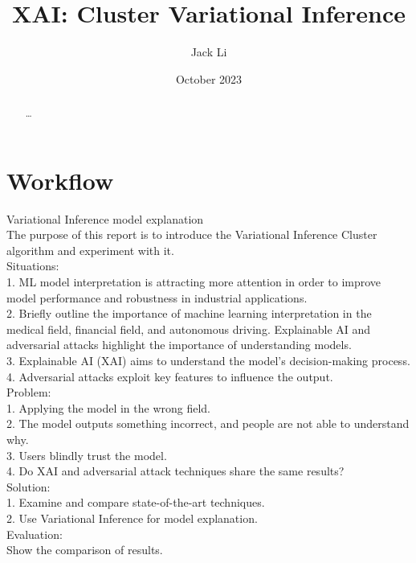 \documentclass[12pt]{article}
\title{XAI: Cluster Variational Inference}
\author{Jack Li}
\date{October 2023}
\begin{document}
\maketitle

\begin{abstract}
\ldots


\end{abstract}

\section{Workflow}

Variational Inference model explanation\\
The purpose of this report is to introduce the Variational Inference Cluster algorithm and experiment with it. \\

Situations:\\
1. ML model interpretation is attracting more attention in order to improve model performance and robustness in industrial applications.\\
2. Briefly outline the importance of machine learning interpretation in the medical field, financial field, and autonomous driving. Explainable AI and adversarial attacks highlight the importance of understanding models.\\
3. Explainable AI (XAI) aims to understand the model's decision-making process.\\
4. Adversarial attacks exploit key features to influence the output.\\

Problem:\\
1. Applying the model in the wrong field.\\
2. The model outputs something incorrect, and people are not able to understand why.\\
3. Users blindly trust the model.\\
4. Do XAI and adversarial attack techniques share the same results?\\

Solution:\\
1. Examine and compare state-of-the-art techniques.\\
2. Use Variational Inference for model explanation.\\

Evaluation:\\
Show the comparison of results.\\
\end{document}
